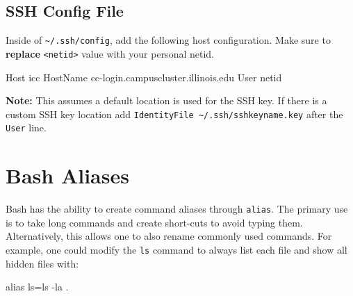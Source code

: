 \documentclass[
  letterpaper,
  DIV=11,
  numbers=noendperiod]{scrreport}
\newenvironment{Shaded}{\begin{snugshade}}{\end{snugshade}}
\newcommand{\AttributeTok}[1]{\textcolor[rgb]{0.40,0.45,0.13}{#1}}
\newcommand{\BuiltInTok}[1]{\textcolor[rgb]{0.00,0.23,0.31}{#1}}
\newcommand{\CommentTok}[1]{\textcolor[rgb]{0.37,0.37,0.37}{#1}}
\newcommand{\ExtensionTok}[1]{\textcolor[rgb]{0.00,0.23,0.31}{#1}}
\newcommand{\KeywordTok}[1]{\textcolor[rgb]{0.00,0.23,0.31}{#1}}
\newcommand{\NormalTok}[1]{\textcolor[rgb]{0.00,0.23,0.31}{#1}}
\newcommand{\StringTok}[1]{\textcolor[rgb]{0.13,0.47,0.30}{#1}}
\newcommand{\VariableTok}[1]{\textcolor[rgb]{0.07,0.07,0.07}{#1}}
\begin{document}
\begin{Shaded}
\end{Shaded}

\hypertarget{ssh-config-file}{%
\subsection{SSH Config File}\label{ssh-config-file}}

Inside of \texttt{\textasciitilde{}/.ssh/config}, add the following host
configuration. Make sure to \textbf{replace}
\texttt{\textless{}netid\textgreater{}} value with your personal netid.

\begin{Shaded}
\begin{Highlighting}[]
\ExtensionTok{Host}\NormalTok{ icc}
    \ExtensionTok{HostName}\NormalTok{ cc{-}login.campuscluster.illinois.edu}
    \ExtensionTok{User}\NormalTok{ netid}
\end{Highlighting}
\end{Shaded}

\textbf{Note:} This assumes a default location is used for the SSH key.
If there is a custom SSH key location add
\texttt{IdentityFile\ \textasciitilde{}/.ssh/sshkeyname.key} after the
\texttt{User} line.

\hypertarget{bash-aliases}{%
\section{Bash Aliases}\label{bash-aliases}}

Bash has the ability to create command aliases through \texttt{alias}.
The primary use is to take long commands and create short-cuts to avoid
typing them. Alternatively, this allows one to also rename commonly used
commands. For example, one could modify the \texttt{ls} command to
always list each file and show all hidden files with:

\begin{Shaded}
\begin{Highlighting}[]
\BuiltInTok{alias}\NormalTok{ ls=}\StringTok{\textquotesingle{}ls {-}la\textquotesingle{}}\KeywordTok{\textasciigrave{}} \BuiltInTok{.}
\end{Highlighting}
\end{Shaded}
\end{document}
